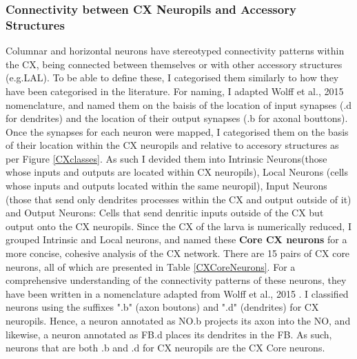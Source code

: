     \subsubsection{Connectivity between CX Neuropils and Accessory Structures}
    Columnar and horizontal neurons have stereotyped connectivity patterns within the CX, being connected between themselves or with other accessory structures (e.g.LAL). To be able to define these, I categorised them similarly to how they have been categorised in the literature. For naming, I adapted Wolff et al., 2015 nomenclature, and named them on the baisis of the location of input synapses (.d for dendrites) and the location of their output synapses (.b for axonal bouttons). Once the synapses for each neuron were mapped, I categorised them on the basis of their location within the CX neuropils and relative to accesory structures as per Figure \ref{CXclasses}.  As such I devided them into Intrinsic Neurons(those whose inputs and outputs are located within CX neuropils), Local Neurons (cells whose inputs and outputs located within the same neuropil), Input Neurons (those that send only dendrites processes within the CX and output outside of it) and Output Neurons: Cells that send denritic inputs outside of the CX but output onto the CX neuropils. Since the CX of the larva is numerically reduced, I grouped Intrinsic and Local neurons, and named these \textbf{Core CX neurons} for a more concise, cohesive analysis of the CX network. There are 15 pairs of CX core neurons, all of which are presented in Table \ref{CXCoreNeurons}. For a comprehensive understanding of the connectivity patterns of these neurons, they have been written in a nomenclature adapted from Wolff et al., 2015 \citep{wolff2015neuroarchitecture}. I classified neurons using the suffixes ".b" (axon boutons) and ".d" (dendrites) for CX neuropils.
    Hence, a neuron annotated as NO.b projects its axon into the NO, and likewise, a neuron annotated as FB.d places its dendrites in the FB.
    As such, neurons that are both .b and .d for CX neuropils are the CX Core neurons. 
